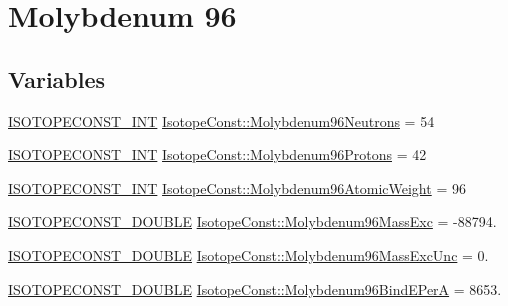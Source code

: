 \hypertarget{group___isotope_const-_molybdenum-_mo96}{}\section{Molybdenum 96}
\label{group___isotope_const-_molybdenum-_mo96}
\subsection*{Variables}
\begin{DoxyCompactItemize}
\item 
\mbox{\hyperlink{group___isotope_const-_macros_ga5f18360b3e99483a35c32d789e62621c}{I\+S\+O\+T\+O\+P\+E\+C\+O\+N\+S\+T\+\_\+\+I\+NT}} \mbox{\hyperlink{group___isotope_const-_molybdenum-_mo96_ga7b92cfb8adf6800f55ad084fb535d7b6}{Isotope\+Const\+::\+Molybdenum96\+Neutrons}} = 54
\item 
\mbox{\hyperlink{group___isotope_const-_macros_ga5f18360b3e99483a35c32d789e62621c}{I\+S\+O\+T\+O\+P\+E\+C\+O\+N\+S\+T\+\_\+\+I\+NT}} \mbox{\hyperlink{group___isotope_const-_molybdenum-_mo96_ga0d97259f257b867dcebe04048b5c2a75}{Isotope\+Const\+::\+Molybdenum96\+Protons}} = 42
\item 
\mbox{\hyperlink{group___isotope_const-_macros_ga5f18360b3e99483a35c32d789e62621c}{I\+S\+O\+T\+O\+P\+E\+C\+O\+N\+S\+T\+\_\+\+I\+NT}} \mbox{\hyperlink{group___isotope_const-_molybdenum-_mo96_ga04c3b8ab5c7598923716bb57c4578db5}{Isotope\+Const\+::\+Molybdenum96\+Atomic\+Weight}} = 96
\item 
\mbox{\hyperlink{group___isotope_const-_macros_ga8f45a7272ce02c0b4c65c44636ed719a}{I\+S\+O\+T\+O\+P\+E\+C\+O\+N\+S\+T\+\_\+\+D\+O\+U\+B\+LE}} \mbox{\hyperlink{group___isotope_const-_molybdenum-_mo96_ga0ecd14e6123bb4533e744ad9a02bcd7e}{Isotope\+Const\+::\+Molybdenum96\+Mass\+Exc}} = -\/88794.
\item 
\mbox{\hyperlink{group___isotope_const-_macros_ga8f45a7272ce02c0b4c65c44636ed719a}{I\+S\+O\+T\+O\+P\+E\+C\+O\+N\+S\+T\+\_\+\+D\+O\+U\+B\+LE}} \mbox{\hyperlink{group___isotope_const-_molybdenum-_mo96_ga3b4bb77c6d2af358c4b622d0e866ba4b}{Isotope\+Const\+::\+Molybdenum96\+Mass\+Exc\+Unc}} = 0.
\item 
\mbox{\hyperlink{group___isotope_const-_macros_ga8f45a7272ce02c0b4c65c44636ed719a}{I\+S\+O\+T\+O\+P\+E\+C\+O\+N\+S\+T\+\_\+\+D\+O\+U\+B\+LE}} \mbox{\hyperlink{group___isotope_const-_molybdenum-_mo96_ga4fc65b803b1ee231c01532a3db3119bf}{Isotope\+Const\+::\+Molybdenum96\+Bind\+E\+PerA}} = 8653.
\item 

\end{DoxyCompactItemize}
